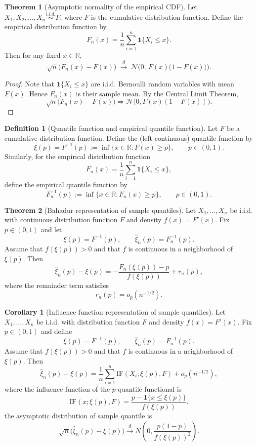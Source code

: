 \documentclass[11pt]{article}
\theoremstyle{definition}
\newtheorem{defn}{Definition}[section]
\newtheorem{theo}{Theorem}[section]
\newtheorem{corollary}{Corollary}[section]
\begin{document}
\begin{theo}[Asymptotic normality of the empirical CDF]
Let $X_1, X_2, \dots, X_n \stackrel{i.i.d.}{\sim} F$, where $F$ is the cumulative distribution function.
Define the empirical distribution function by
\[
F_n(x) = \frac{1}{n} \sum_{i=1}^n \mathbf{1}\{X_i \le x\}.
\]
Then for any fixed $x \in \mathbb{R}$,
\[
\sqrt{n}\big(F_n(x) - F(x)\big)
\;\xrightarrow{d}\;
\mathcal{N}\big(0,\, F(x)\big(1 - F(x)\big)\big).
\]
\end{theo}
\begin{proof}
Note that $\mathbf{1}\{X_i \le x\}$ are i.i.d. Bernoulli random variables with mean $F(x)$.
Hence $F_n(x)$ is their sample mean. By the Central Limit Theorem,
\[
\sqrt{n}\big(F_n(x) - F(x)\big)
\Rightarrow \mathcal{N}\big(0, F(x)(1-F(x))\big).
\]
\end{proof}
\begin{defn}[Quantile function and empirical quantile function]
Let $F$ be a cumulative distribution function. Define the (left-continuous) quantile function by
\[
\xi(p) = F^{-1}(p)
:= \inf\{x \in \mathbb{R} : F(x) \ge p\},
\qquad p \in (0,1).
\]
Similarly, for the empirical distribution function
\[
F_n(x) = \frac{1}{n} \sum_{i=1}^n \mathbf{1}\{X_i \le x\},
\]
define the empirical quantile function by
\[
F_n^{-1}(p)
:= \inf\{x \in \mathbb{R} : F_n(x) \ge p\},
\qquad p \in (0,1).
\]
\end{defn}

\begin{theo}[Bahadur representation of sample quantiles]
Let $X_1,\dots,X_n$ be i.i.d. with continuous distribution function $F$ and density 
$f(x) = F'(x)$. Fix $p \in (0,1)$ and let 
\[
\xi(p) = F^{-1}(p), 
\qquad 
\hat{\xi}_n(p) = F_n^{-1}(p).
\]
Assume that $f(\xi(p)) > 0$ and that $f$ is continuous in a neighborhood of $\xi(p)$. 
Then
\[
\hat{\xi}_n(p) - \xi(p)
=
- \frac{F_n(\xi(p)) - p}{f(\xi(p))} 
+ r_n(p),
\]
where the remainder term satisfies
\[
r_n(p) = o_p(n^{-1/2}).
\]
\end{theo}
\begin{corollary}[Influence function representation of sample quantiles]
Let $X_1,\dots,X_n$ be i.i.d. with distribution function $F$ and density 
$f(x) = F'(x)$. Fix $p \in (0,1)$ and define
\[
\xi(p) = F^{-1}(p), 
\qquad 
\hat{\xi}_n(p) = F_n^{-1}(p).
\]
Assume that $f(\xi(p)) > 0$ and that $f$ is continuous in a neighborhood of $\xi(p)$. 
Then
\[
\hat{\xi}_n(p) - \xi(p)
=
\frac{1}{n} \sum_{i=1}^n \mathrm{IF}(X_i; \xi(p), F)
+ o_p(n^{-1/2}),
\]
where the influence function of the $p$-quantile functional is
\[
\mathrm{IF}(x; \xi(p), F)
=
\frac{p - \mathbf{1}\{x \le \xi(p)\}}{f(\xi(p))}.
\]
the asymptotic distribution of sample quantile is
\[
\sqrt{n}\bigl(\hat{\xi}_n(p) - \xi(p)\bigr)
\xrightarrow{d}
N\!\left(0, \frac{p(1-p)}{f(\xi(p))^2}\right).
\]
\end{corollary}
\end{document}
